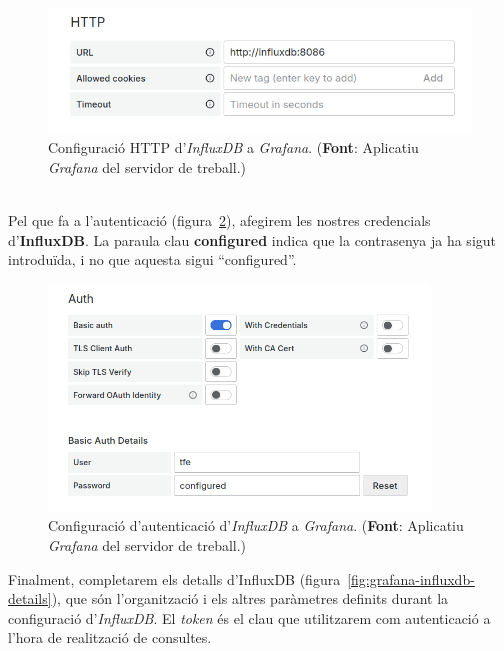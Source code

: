 \begin{figure}[htbp]
    \centerline{\includegraphics[width=\textwidth]{figures/grafana-influxdb-http}}
    \captionsetup{justification=centering}
    \caption[Configuració HTTP d'\textit{InfluxDB} a \textit{Grafana}.]{Configuració HTTP d'\textit{InfluxDB} a \textit{Grafana}. (\textbf{Font}: Aplicatiu \textit{Grafana} del servidor de treball.)}\label{fig:grafana-influxdb-http}
\end{figure}

\noindent \\
Pel que fa a l'autenticació (figura~\ref{fig:grafana-influxdb-auth}), afegirem les nostres credencials d'\textbf{InfluxDB}.
La paraula clau \textbf{configured} indica que la contrasenya ja ha sigut introduïda, i no que aquesta sigui ``configured''.

\begin{figure}[htbp]
    \centerline{\includegraphics[width=0.9\textwidth]{figures/grafana-influxdb-auth}}
    \captionsetup{justification=centering}
    \caption[Configuració d'autenticació d'\textit{InfluxDB} a \textit{Grafana}.]{Configuració d'autenticació d'\textit{InfluxDB} a \textit{Grafana}. (\textbf{Font}: Aplicatiu \textit{Grafana} del servidor de treball.)}\label{fig:grafana-influxdb-auth}
\end{figure}

\clearpage
\noindent
Finalment, completarem els detalls d'InfluxDB (figura~\ref{fig:grafana-influxdb-details}), que són l'organització i els altres paràmetres definits durant la configuració d'\textit{InfluxDB}.
El \textit{token} és el clau que utilitzarem com autenticació a l'hora de realització de consultes.

